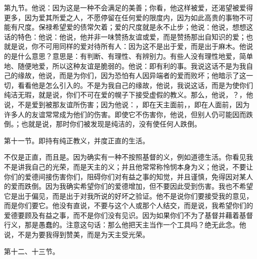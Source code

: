 第九节。他说：因为这是一种不会满足的美善；你看，他这样被爱，还渴望被爱得更多，因为爱其所爱之人，不愿停留在任何爱的限度内，因为如此高贵的事物不可能有尺度。保禄希望爱的债常欠着；爱的尺度就是永不止步；他说：他说，想想这话的特色：他说：他说，他并非一味赞扬友谊或爱，而是赞扬那出自知识的爱；也就是说，你不可用同样的爱对待所有人：因为这不是出于爱，而是出于麻木。他说的是什么意思？意思是：有判断、有理性、有辨别力。有些人没有理性地爱，简单地、随便地爱，所以这种友谊是脆弱的。他说：即有利的事。我说这话不是为我自己的缘故，他说，而是为你们，因为恐怕有人因异端者的爱而败坏；他暗示了这一切，看看他是怎么引入的。不是为我自己的缘故，他说，我说这话，而是为使你们纯洁无瑕，就是说，你们不可在爱的幌子下接受虚假的教义。那么，他说，？，他说，不是爱到被那友谊所伤害；因为他说：，即在天主面前，，即在人面前，因为许多人的友谊常常成为他们的伤害。即使它不伤害你，他说，但别人仍可能因而跌倒。；也就是说，那时你们被发现是纯洁的，没有使任何人跌倒。\par

第十一节。即持有纯正教义，并度正直的生活。\par

不仅是正直，而且是。因为确实有一种不按照基督的义，例如道德生活。你看见我不是讲我自己的光荣，而是天主的义；并且他常常称怜悯本身为义；他说，不要让你们的爱德间接伤害你们，阻碍你们对有益之事的知觉，并且谨慎，免得因对某人的爱而跌倒。因为我确实希望你们的爱德增加，但不要因此受到伤害。我也不希望它是出于偏见，而是出于对我所说的好坏之验证。他不是说你们要接受我的意见，而是你们要它。他没有直说，不要与这个人或那个人结交，而是说，我希望你们的爱德要顾及有益之事，而不是你们没有见识。因为如果你们不为了基督并藉着基督行义，那是愚蠢的。注意这句话：那么他把天主当作一个工具吗？绝无此念。他说，不是为要我得到赞美，而是为天主受光荣。\par

第十二、十三节。\par

